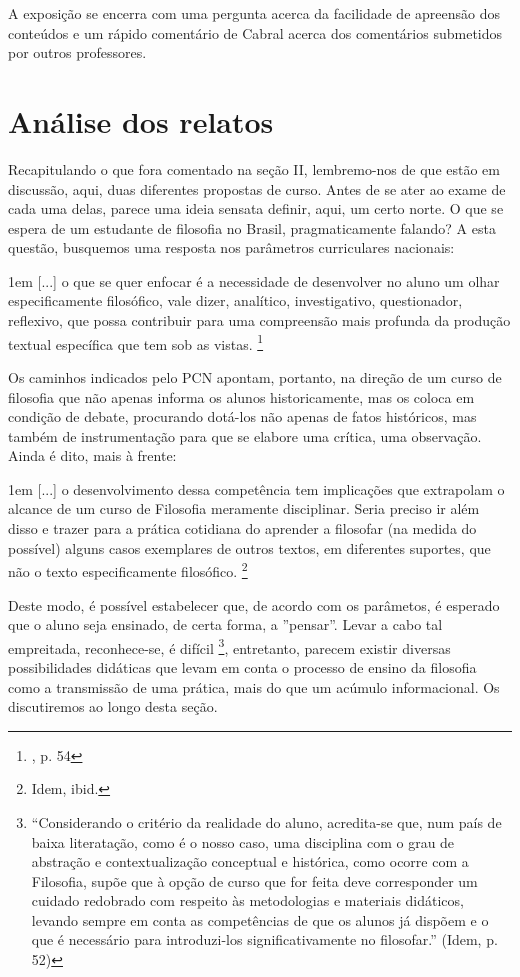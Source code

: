 \documentclass[12pt,a4paper]{article}
\newenvironment{citac}{\begin{addmargin}[4cm]{1em} \footnotesize}{\normalfont \end{addmargin}}
\begin{document}
	A exposição se encerra com uma pergunta acerca da facilidade de 
	apreensão dos conteúdos e um rápido comentário de Cabral acerca 
	dos comentários submetidos por outros professores. 
	
	\newpage
		
	\section{Análise dos relatos}

	Recapitulando o que fora comentado na seção II, lembremo-nos de que 
	estão em discussão, aqui, duas diferentes propostas de curso. Antes de 
	se ater ao exame de cada uma delas, parece uma ideia sensata definir, 
	aqui, um certo norte. O que se espera de um estudante de filosofia 
	no Brasil, pragmaticamente falando? A esta questão, busquemos uma 
	resposta nos parâmetros curriculares nacionais: 

	\begin{citac}
		[...]
		o que se quer enfocar é a necessidade de desenvolver no aluno 
		um  olhar especificamente filosófico, vale dizer, analítico,  
		investigativo, questionador, reflexivo, que possa contribuir 
		para uma compreensão mais profunda da produção textual 
		específica  que  tem sob as vistas. 
		\footnote{\cite{pcn}, p. 54}
	\end{citac}

	Os caminhos indicados pelo PCN apontam, portanto, na direção de um 
	curso de filosofia que não apenas informa os alunos historicamente, 
	mas os coloca em condição de debate, procurando dotá-los não apenas 
	de fatos históricos, mas também de instrumentação para que se elabore 
	uma crítica, uma observação. Ainda é dito, mais à frente: 

	\begin{citac}
		[...]
		o desenvolvimento dessa competência tem implicações que extrapolam o alcance de  um  curso  de  Filosofia  meramente  disciplinar.  Seria  preciso  ir  além  disso  e  trazer  para  a  prática cotidiana do aprender a filosofar (na medida do possível) alguns casos exemplares de outros  textos,  em  diferentes  suportes,  que  não  o  texto  especificamente  filosófico.
		\footnote{Idem, ibid.}
	\end{citac}

	Deste modo, é possível estabelecer que, de acordo com os parâmetos, 
	é esperado que o aluno seja ensinado, de certa forma, a ”pensar”. 
	Levar a cabo tal empreitada, reconhece-se, é difícil
	\footnote{
	“Considerando  o  critério  da  realidade  do  aluno,  acredita-se  que,  num  país  de  baixa  literatação, como é o nosso caso, uma disciplina com o grau de abstração e contextualização conceptual e histórica, como ocorre com a Filosofia, supõe que à opção de curso que for feita deve corresponder um cuidado redobrado com respeito às metodologias e materiais didáticos, levando sempre em conta as competências de que os alunos já dispõem e o que é necessário para  introduzi-los  significativamente  no  filosofar.” (Idem, p. 52)
	}, 
	entretanto, parecem existir diversas possibilidades didáticas 
	que levam em conta o processo de ensino da filosofia como a 
	transmissão de uma prática, mais do que um acúmulo informacional. 
	Os discutiremos ao longo desta seção. 
\end{document}
